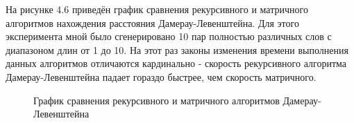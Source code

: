На рисунке 4.6 приведён график сравнения рекурсивного и матричного алгоритмов нахождения расстояния Дамерау-Левенштейна. Для этого эксперимента мной было сгенерировано 10 пар полностью различных слов с диапазоном длин от 1 до 10. На этот раз законы изменения времени выполнения данных алгоритмов отличаются кардинально - скорость рекурсивного алгоритма Дамерау-Левенштейна падает гораздо быстрее, чем скорость матричного.
\begin{figure}[H]
    \centering
    \caption{График сравнения рекурсивного и матричного алгоритмов Дамерау-Левенштейна}
\end{figure}


